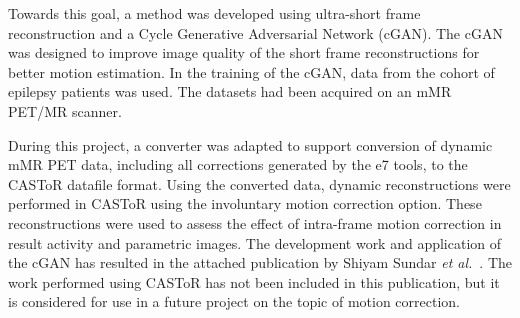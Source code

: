 Towards this goal, a method was developed using ultra-short frame reconstruction 
and a Cycle Generative Adversarial Network (cGAN). The cGAN was designed to improve image quality of the short frame reconstructions for better motion estimation. In the training of the cGAN, data from the cohort of epilepsy patients was used. The datasets had been acquired on an mMR PET/MR scanner.

During this project, a converter was adapted to support conversion of dynamic mMR PET data, including all corrections generated by the e7 tools, to the CASToR datafile format. Using the converted data, dynamic reconstructions were performed in CASToR using the involuntary motion correction option. These reconstructions were used to assess the effect of intra-frame motion correction in result activity and parametric images.
The development work and application of the cGAN has resulted in the attached publication by Shiyam Sundar \textit{et al.}~\cite{ShiyamSundar2020}. The work performed using CASToR has not been included in this publication, but it is considered for use in a future project on the topic of motion correction.

\cleardoublepage

\cleardoublepage
